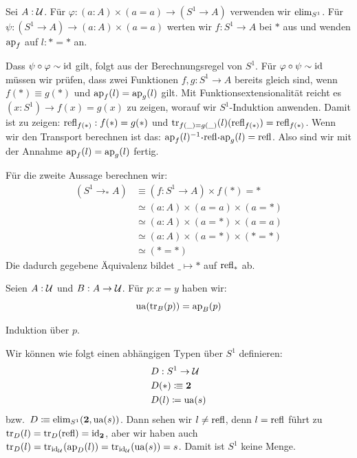 \begin{beweis}
  Sei $A:\mathcal{U}$. 
  Für $\varphi:(a:A)\times (a=a) \to (S^1\to A)$ verwenden wir $\mathrm{elim}_{S^1}$.
  Für $\psi:(S^1\to A) \to (a:A)\times (a=a)$ werten wir $f:S^1\to A$ bei $\ast$ aus und wenden $\mathrm{ap}_f$ auf $l:\ast=\ast$ an.

  Dass $\psi\circ \varphi\sim\mathrm{id}$ gilt, folgt aus der Berechnungsregel von $S^1$.
  Für $\varphi\circ \psi\sim\mathrm{id}$ müssen wir prüfen, dass zwei Funktionen $f,g:S^1\to A$ bereits gleich sind, wenn $f(\ast)\equiv g(\ast)$ und $\mathrm{ap}_f(l)=\mathrm{ap}_g(l)$ gilt.
  Mit Funktionsextensionalität reicht es $(x:S^1)\to f(x)=g(x)$ zu zeigen, worauf wir $S^1$-Induktion anwenden.
  Damit ist zu zeigen: $\mathrm{refl}_{f(\ast)}:f(\ast)=g(\ast)$ und $\mathrm{tr}_{f(\_)=g(\_)}(l)(\mathrm{refl}_{f(\ast)})=\mathrm{refl}_{f(\ast)}$. Wenn wir den Transport berechnen ist das: $\ap_f(l)^{-1}\kon \refl\kon \ap_g(l)=\refl$. Also sind wir mit der Annahme $\mathrm{ap}_f(l)=\mathrm{ap}_g(l)$ fertig.

  Für die zweite Aussage berechnen wir:
  \begin{align*}
    (S^1\to_\ast A)&\equiv (f:S^1\to A)\times f(\ast)=\ast \\
    &\simeq (a:A)\times (a=a) \times (a=\ast) \\
    &\simeq (a:A)\times (a=\ast) \times (a=a) \\
    &\simeq (a:A)\times (a=\ast) \times (\ast=\ast) \\
    &\simeq (\ast=\ast) 
  \end{align*}
  Die dadurch gegebene Äquivalenz bildet $\_\mapsto \ast$ auf $\mathrm{refl}_\ast$ ab.
\end{beweis}

\begin{lemma}
  \label{ua-transport-ap}
  Seien $A:\mathcal{U}$ und $B:A\to \mathcal{U}$.
  Für $p:x=y$ haben wir:
  \[
    \mathrm{ua}(\mathrm{tr}_B(p))=\mathrm{ap}_B(p)
  \]
\end{lemma}

\begin{beweis}
  Induktion über $p$.
\end{beweis}

\begin{beispiel}
  Wir können wie folgt einen abhängigen Typen über $S^1$ definieren:
  \begin{align*}
    &D:S^1\to \mathcal{U} \\
    &D(\ast)\vcentcolon\mspace{-1.2mu}\equiv \mathbf{2} \\
    &D(l)\coloneq \mathrm{ua}(s)
  \end{align*}
  bzw.\ $D\vcentcolon\mspace{-1.2mu}\equiv \mathrm{elim}_{S^1}(\mathbf{2},\mathrm{ua}(s))$.
  Dann sehen wir $l\neq \mathrm{refl}$, denn $l=\mathrm{refl}$ führt zu $\mathrm{tr}_D(l)=\mathrm{tr}_D(\mathrm{refl})=\mathrm{id}_{\mathbf{2}}$, aber wir haben auch $\mathrm{tr}_D(l)=\mathrm{tr}_{\mathrm{id}_{\mathcal{U}}}(\mathrm{ap}_D(l))=\mathrm{tr}_{\mathrm{id}_{\mathcal{U}}}(\mathrm{ua}(s))=s$.
  Damit ist $S^1$ keine Menge.
\end{beispiel}

